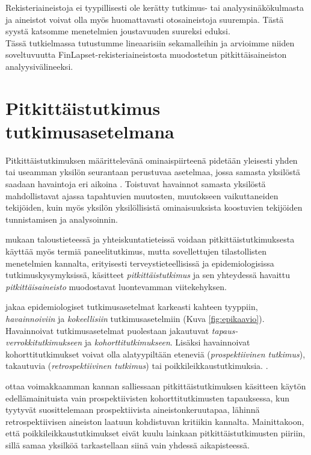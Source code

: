 \documentclass[finnish]{docopts}
\begin{document}
Rekisteriaineistoja ei tyypillisesti ole kerätty tutkimus- tai analyysinäkökulmasta ja aineistot voivat olla myös huomattavasti otosaineistoja suurempia. Tästä syystä katsomme menetelmien joustavuuden suureksi eduksi.\\

Tässä tutkielmassa tutustumme lineaarisiin sekamalleihin ja arvioimme niiden soveltuvuutta FinLapset-rekisteriaineistosta muodostetun pitkittäisaineiston analyysivälineeksi.\\

\section{Pitkittäistutkimus tutkimusasetelmana}
\label{sec:pitkittaistutkimus}

Pitkittäistutkimuksen määrittelevänä ominaispiirteenä pidetään yleisesti yhden tai useamman yksilön seurantaan perustuvaa asetelmaa, jossa samasta yksilöstä saadaan havaintoja eri aikoina \citep{diggle13, fitzmaurice11, twisk13, laird82}. Toistuvat havainnot samasta yksilöstä mahdollistavat ajassa tapahtuvien muutosten, muutokseen vaikuttaneiden tekijöiden, kuin myös yksilön yksilöllisistä ominaisuuksista koostuvien tekijöiden tunnistamisen ja analysoinnin.

\cite{diggle13} mukaan taloustieteessä ja yhteiskuntatieteissä voidaan pitkittäistutkimuksesta käyttää myös termiä paneelitutkimus, mutta sovellettujen tilastollisten menetelmien kannalta, erityisesti terveystieteellisissä ja epidemiologisissa tutkimuskysymyksissä, käsitteet \textit{pitkittäistutkimus} ja sen yhteydessä havaittu \textit{pitkittäisaineisto} muodostavat luontevamman viitekehyksen.

\cite{twisk13} jakaa epidemiologiset tutkimusasetelmat karkeasti kahteen tyyppiin, \textit{havainnoiviin} ja \textit{kokeellisiin} tutkimusasetelmiin (Kuva \ref{fig:epikaavio}). Havainnoivat tutkimusasetelmat puolestaan jakautuvat \textit{tapaus-verrokkitutkimukseen} ja \textit{kohorttitutkimukseen}. Lisäksi havainnoivat kohorttitutkimukset voivat olla alatyypiltään eteneviä (\textit{prospektiivinen tutkimus}), takautuvia (\textit{retrospektiivinen tutkimus}) tai poikkileikkaustutkimuksia. \cite{diggle13, twisk13}.

\cite{twisk13} ottaa voimakkaamman kannan salliessaan pitkittäistutkimuksen käsitteen käytön edellämainituista vain prospektiivisten kohorttitutkimusten tapauksessa, kun \cite{diggle13} tyytyvät suosittelemaan prospektiivista aineistonkeruutapaa, lähinnä retrospektiivisen aineiston laatuun kohdistuvan kritiikin kannalta. Mainittakoon, että poikkileikkaustutkimukset eivät kuulu lainkaan pitkittäistutkimusten piiriin, sillä samaa yksilköä tarkastellaan siinä vain yhdessä aikapisteessä.\\
\end{document}
